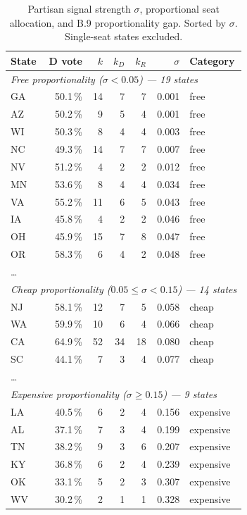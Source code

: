 \begin{table}[h]
\centering
\caption{Partisan signal strength $\sigma$, proportional seat allocation, and
B.9 proportionality gap.  Sorted by $\sigma$. Single-seat states excluded.}
\label{tab:sigma}
\small
\begin{tabular}{lrrrrrl}
\toprule
State & D vote & $k$ & $k_D$ & $k_R$ & $\sigma$ & Category \\
\midrule
\multicolumn{7}{l}{\textit{Free proportionality ($\sigma < 0.05$) --- 19 states}} \\
GA & 50.1\,\% & 14 & 7 & 7 & 0.001 & free \\
AZ & 50.2\,\% &  9 & 5 & 4 & 0.001 & free \\
WI & 50.3\,\% &  8 & 4 & 4 & 0.003 & free \\
NC & 49.3\,\% & 14 & 7 & 7 & 0.007 & free \\
NV & 51.2\,\% &  4 & 2 & 2 & 0.012 & free \\
MN & 53.6\,\% &  8 & 4 & 4 & 0.034 & free \\
VA & 55.2\,\% & 11 & 6 & 5 & 0.043 & free \\
IA & 45.8\,\% &  4 & 2 & 2 & 0.046 & free \\
OH & 45.9\,\% & 15 & 7 & 8 & 0.047 & free \\
OR & 58.3\,\% &  6 & 4 & 2 & 0.048 & free \\
\ldots \\
\midrule
\multicolumn{7}{l}{\textit{Cheap proportionality ($0.05 \leq \sigma < 0.15$) --- 14 states}} \\
NJ & 58.1\,\% & 12 & 7 & 5 & 0.058 & cheap \\
WA & 59.9\,\% & 10 & 6 & 4 & 0.066 & cheap \\
CA & 64.9\,\% & 52 & 34 & 18 & 0.080 & cheap \\
SC & 44.1\,\% &  7 & 3 & 4 & 0.077 & cheap \\
\ldots \\
\midrule
\multicolumn{7}{l}{\textit{Expensive proportionality ($\sigma \geq 0.15$) --- 9 states}} \\
LA & 40.5\,\% &  6 & 2 & 4 & 0.156 & expensive \\
AL & 37.1\,\% &  7 & 3 & 4 & 0.199 & expensive \\
TN & 38.2\,\% &  9 & 3 & 6 & 0.207 & expensive \\
KY & 36.8\,\% &  6 & 2 & 4 & 0.239 & expensive \\
OK & 33.1\,\% &  5 & 2 & 3 & 0.307 & expensive \\
WV & 30.2\,\% &  2 & 1 & 1 & 0.328 & expensive \\
\bottomrule
\end{tabular}
\end{table}

